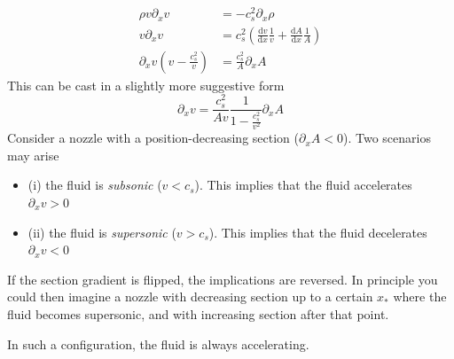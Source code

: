 \begin{align*}
    \rho v \partial_{x}v &= -c_{s}^{2}\partial_{x}\rho\\
    v\partial_{x}v &= c_{s}^{2}\left(\frac{\text{d}v}{\text{d}x}\frac{1}{v}+\frac{\text{d}A}{\text{d}x}\frac{1}{A}\right)\\
    \partial_{x}v\left(v-\frac{c_{s}^{2}}{v}\right) &= \frac{c_{s}^{2}}{A}\partial_{x}A
\end{align*}
This can be cast in a slightly more suggestive form 
\begin{equation}
    \boxed{
        \partial_{x}v = \frac{c_{s}^{2}}{Av}\frac{1}{1-\frac{c_{s}^{2}}{v^{2}}}\partial_{x}A
    }
    \label{eq:lavallenozzle}
\end{equation}
Consider a nozzle with a position-decreasing section ($\partial_{x}A < 0$). Two scenarios may arise 
\begin{itemize}
    \item (i) the fluid is \emph{subsonic} ($v<c_{s}$). This implies that the fluid accelerates $\partial_{x}v > 0$
    \item (ii) the fluid is \emph{supersonic} ($v>c_{s}$). This implies that the fluid decelerates $\partial_{x}v < 0$
\end{itemize}
If the section gradient is flipped, the implications are reversed. In principle you could then imagine a nozzle with decreasing section up to a certain $x_{*}$ where the fluid becomes supersonic, and with increasing section after that point. 
\par In such a configuration, the fluid is always accelerating.
